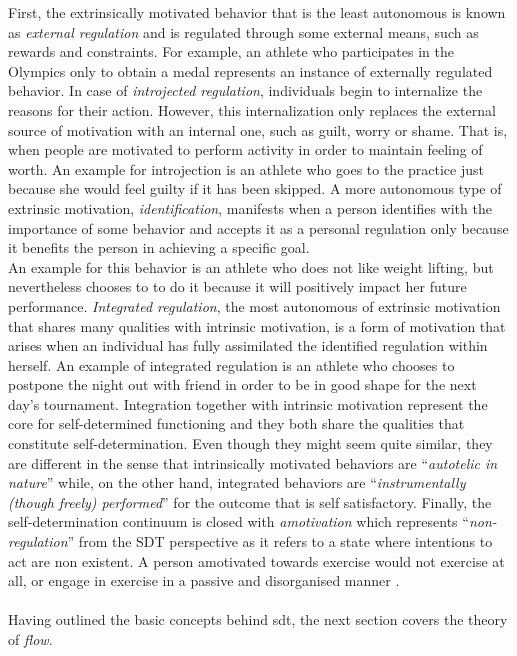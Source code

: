 First, the extrinsically motivated behavior that is the least autonomous is known as \textit{external regulation} and is regulated through some external means, such as rewards and constraints. For example, an athlete who participates in the Olympics only to obtain a medal represents an instance of externally regulated behavior. In case of \textit{introjected regulation}, individuals begin to internalize the reasons for their action. However, this internalization only replaces the external source of motivation with an internal one, such as guilt, worry or shame. That is, when people are motivated to perform activity in order to maintain feeling of worth. An example for introjection is an athlete who goes to the practice just because she would feel guilty if it has been skipped. A more autonomous type of extrinsic motivation, \textit{identification}, manifests when a person identifies with the importance of some behavior and accepts it as a personal regulation only because it benefits the person in achieving a specific goal. \\An example for this behavior is an athlete who does not like weight lifting, but nevertheless chooses to to do it because it will positively impact her future performance. \textit{Integrated regulation}, the most autonomous of extrinsic motivation that shares many qualities with intrinsic motivation, is a form of motivation that arises when an individual has fully assimilated the identified regulation within herself. An example of integrated regulation is an athlete who chooses to postpone the night out with friend in order to be in good shape for the next day's tournament. Integration together with intrinsic motivation represent the core for self-determined functioning and they both share the qualities that constitute self-determination. Even though they might seem quite similar, they are different in the sense that intrinsically motivated behaviors are ``\textit{autotelic in nature}'' while, on the other hand, integrated behaviors are ``\textit{instrumentally (though freely) performed}'' for the outcome that is self satisfactory.  Finally, the self-determination continuum is closed with  \textit{amotivation} which represents ``\textit{non-regulation}'' from the SDT perspective as it refers to a state where intentions to act are non existent. A person amotivated towards exercise would not exercise at all, 
or engage in exercise in a passive and disorganised  manner \cite{deci1994promoting, ryan2000intrinsic, vallerand2007intrinsic}.\\\\
Having outlined the basic concepts behind \acrshort{sdt}, the next section covers the theory of \textit{flow}.
